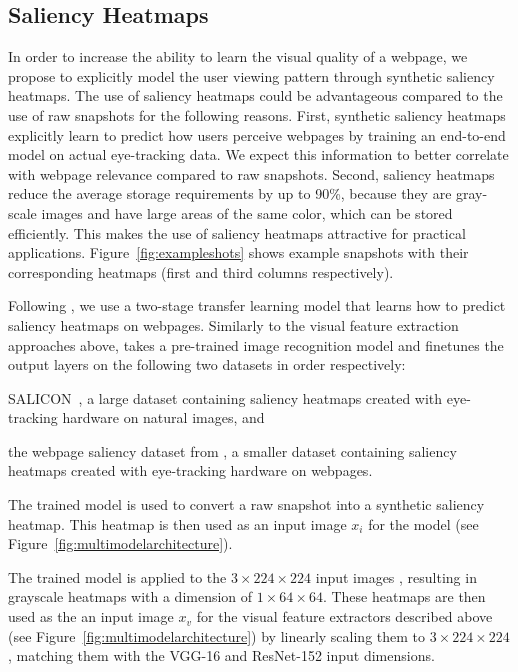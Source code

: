 \subsection{Saliency Heatmaps} \label{sec:saliency}
In order to increase the ability to learn the visual quality of a webpage, we propose to explicitly model the user viewing pattern through synthetic saliency heatmaps.
The use of saliency heatmaps could be advantageous compared to the use of raw snapshots for the following reasons.
First, synthetic saliency heatmaps explicitly learn to predict how users perceive webpages by training an end-to-end model on actual eye-tracking data.
We expect this information to better correlate with webpage relevance compared to raw snapshots.
Second, saliency heatmaps reduce the average storage requirements by up to 90\%,
because they are gray-scale images and have large areas of the same color, which can be stored efficiently.
This makes the use of saliency heatmaps attractive for practical applications.
Figure~\ref{fig:exampleshots} shows example snapshots with their corresponding heatmaps (first and third columns respectively).

Following \cite{shan2017two}, we use a two-stage transfer learning model that learns how to predict saliency heatmaps on webpages.
Similarly to the visual feature extraction approaches above, \cite{shan2017two} takes a pre-trained image recognition model and finetunes the output layers on the following two datasets in order respectively:
\begin{inparaenum}[(i)]
\item SALICON~\cite{jiang2015salicon}, a large dataset containing saliency heatmaps created with eye-tracking hardware on natural images, and 
\item the webpage saliency dataset from \cite{shen2014webpage}, a smaller dataset containing saliency heatmaps created with eye-tracking hardware on webpages.
\end{inparaenum}

The trained model is used to convert a raw snapshot into a synthetic saliency heatmap. This heatmap is then used as an input image $x_i$ for the \modelname{} model (see Figure~\ref{fig:multimodelarchitecture}).

The trained model is applied to the $3\times224\times224$ input images , resulting in grayscale heatmaps with a dimension of $1\times64\times64$.
These heatmaps are then used as the an input image $x_{v}$ for the visual feature extractors described above (see Figure~\ref{fig:multimodelarchitecture}) by linearly scaling them to $3\times224\times224$, matching them with the VGG-16 and ResNet-152 input dimensions.
\fi